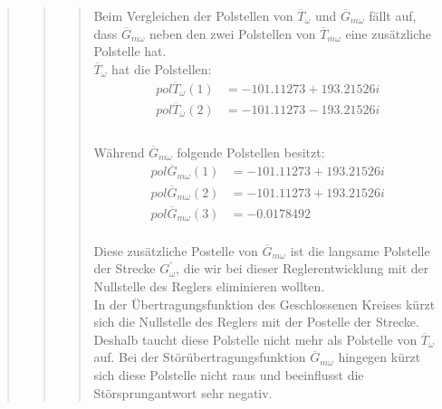 \begin{quote}
\begin{quote}
\begin{quote}
            Beim Vergleichen der Polstellen von $\overline{T}_\omega$ und $\overline{G}_{m\omega}$ fällt auf, dass
            $\overline{G}_{m\omega}$ neben den zwei Polstellen von $\overline{T}_{m\omega}$ eine zusätzliche Polstelle hat.\\
            
            $\overline{T}_\omega$ hat die Polstellen:\\
            \begin{equation*}
                \begin{split}
                    pol \overline{T}_\omega (1) &= - 101.11273 + 193.21526i\\
                    pol \overline{T}_\omega (2) &= - 101.11273 - 193.21526i\\
                \end{split}
            \end{equation*}\\
            
             Während $\overline{G}_{m\omega}$ folgende Polstellen besitzt:\\
             
            \begin{equation*}
                \begin{split}
                    pol \overline{G}_{m\omega} (1) &= - 101.11273 + 193.21526i\\
                    pol \overline{G}_{m\omega} (2) &= - 101.11273 + 193.21526i\\
                    pol \overline{G}_{m\omega} (3) &= - 0.0178492\\
                \end{split}
            \end{equation*}
            
            Diese zusätzliche Postelle von $\overline{G}_{m\omega}$ ist die langsame Polstelle der Strecke
            $G_\omega^{'}$, die wir bei dieser Reglerentwicklung mit der Nullstelle des Reglers eliminieren wollten.\\
            In der Übertragungsfunktion des Geschlossenen Kreises kürzt sich die Nullstelle des Reglers mit der
            Postelle der Strecke. Deshalb taucht diese Polstelle nicht mehr als Polstelle von $\overline{T}_\omega$
            auf. Bei der Störübertragungsfunktion $\overline{G}_{m\omega}$ hingegen kürzt sich diese Polstelle nicht
            raus und beeinflusst die Störsprungantwort sehr negativ.\\
            

\end{quote}
\end{quote}
\end{quote}
